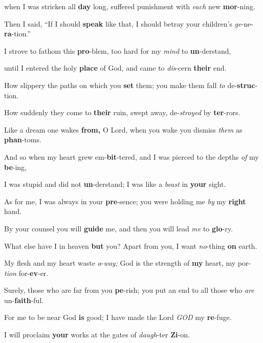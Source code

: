 \item when I was stricken all \textbf{day} long, \mediant
 suffered punishment with \textit{each} new \textbf{mor}-ning. 

\item Then I said, “If I should \textbf{speak} like that, \mediant
 I should betray your children’s \textit{ge}-ne-\textbf{ra}-tion.” 

\item I strove to fathom this \textbf{pro}-blem, \mediant
 too hard for my \textit{mind} to \textbf{un}-derstand, 

\item until I entered the holy \textbf{place} of God, \mediant
 and came to \textit{dis}-cern \textbf{their} end. 

\item How slippery the paths on which you \textbf{set} them; \mediant
 you make them fall \textit{to} de-\textbf{struc}-tion. 

\item How suddenly they come to \textbf{their} ruin, \mediant
 swept away, de-\textit{stroyed} by \textbf{ter}-rors. 

\item Like a dream one wakes \textbf{from,} O Lord, \mediant
 when you wake you dismiss \textit{them} as \textbf{phan}-toms. 

\item And so when my heart grew em-\textbf{bit}-tered, \mediant
 and I was pierced to the depths \textit{of} my \textbf{be}-ing, 

\item I was stupid and did not \textbf{un}-derstand; \mediant
 I was like a \textit{beast} in \textbf{your} sight. 

\item As for me, I was always in your \textbf{pre}-sence; \mediant
 you were holding me \textit{by} my \textbf{right} hand. 

\item By your counsel you will \textbf{guide} me, \mediant
 and then you will lead \textit{me} to \textbf{glo}-ry. 

\item What else have I in heaven \textbf{but} you? \mediant
 Apart from you, I want \textit{no}-thing \textbf{on} earth. 

\item My flesh and my heart waste \textit{a}-\textit{way;} \flex
God is the strength of \textbf{my} heart, \mediant
 my por-\textit{tion} for-\textbf{ev}-er. 

\item Surely, those who are far from you \textbf{pe}-rish; \mediant
 you put an end to all those who \textit{are} un-\textbf{faith}-ful. 

\item For me to be near God \textbf{is} good; \mediant
 I have made the Lord \textit{GOD} my \textbf{re}-fuge. 

\item I will proclaim \textbf{your} works \mediant
 at the gates of \textit{daugh}-ter \textbf{Zi}-on. 
